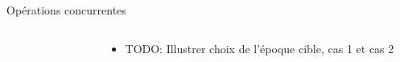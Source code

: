\begin{frame}[fragile]{Opérations \ren concurrentes}
\begin{columns}
\begin{column}{0.3 \textwidth}
\begin{figure}
{
        }
      \end{figure}
    \end{column}
    \begin{column}{0.7 \textwidth}
      \begin{itemize}
        \item TODO: Illustrer choix de l'époque cible, cas 1 et cas 2
      \end{itemize}
    \end{column}
  \end{columns}
\end{frame}



